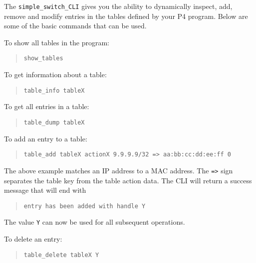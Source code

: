



The \texttt{simple\_switch\_CLI} gives you the ability to dynamically inspect, add, remove and modify entries in the tables defined by your P4 program. Below are some of the basic commands that can be used.

To show all tables in the program:
\begin{quote}
    \texttt{show\_tables}
\end{quote}

To get information about a table:
\begin{quote}
    \texttt{table\_info tableX}
\end{quote}

To get all entries in a table:
\begin{quote}
    \texttt{table\_dump tableX}
\end{quote}

To add an entry to a table:
\begin{quote}
    \texttt{table\_add tableX actionX 9.9.9.9/32 => aa:bb:cc:dd:ee:ff 0}
\end{quote}

The above example matches an IP address to a MAC address. The \texttt{=>} sign separates the table key from the table action data. The CLI will return a success message that will end with 
\begin{quote}
    \texttt{entry has been added with handle Y}
\end{quote}
The value \texttt{Y} can now be used for all subsequent operations.

To delete an entry:
\begin{quote}
    \texttt{table\_delete tableX Y}
\end{quote}
